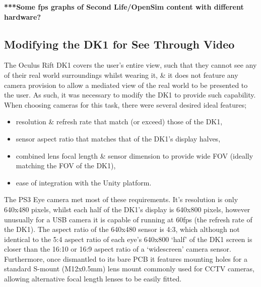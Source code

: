 \textbf{***Some fps graphs of Second Life/OpenSim content with different hardware?}


\subsection{Modifying the DK1 for See Through Video}

The Oculus Rift DK1 covers the user's entire view, such that they cannot see any of their real world surroundings whilst wearing it, \& it does not feature any camera provision to allow a mediated view of the real world to be presented to the user. As such, it was necessary to modify the DK1 to provide such capability. When choosing cameras for this task, there were several desired ideal features;
\begin{itemize}
	\item resolution \& refresh rate that match (or exceed) those of the DK1,
	\item sensor aspect ratio that matches that of the DK1's display halves,
	\item combined lens focal length \& sensor dimension to provide wide FOV (ideally matching the FOV of the DK1),
	\item ease of integration with the Unity platform.
\end{itemize}

The PS3 Eye camera met most of these requirements. It's resolution is only 640x480 pixels, whilst each half of the DK1's display is 640x800 pixels, however unusually for a USB camera it is capable of running at 60fps (the refresh rate of the DK1). The aspect ratio of the 640x480 sensor is 4:3, which although not identical to the 5:4 aspect ratio of each eye's 640x800 `half' of the DK1 screen is closer than the 16:10 or 16:9 aspect ratio of a `widescreen' camera sensor. Furthermore, once dismantled to its bare PCB it features mounting holes for a standard S-mount (M12x0.5mm) lens mount commonly used for CCTV cameras, allowing alternative focal length lenses to be easily fitted.

